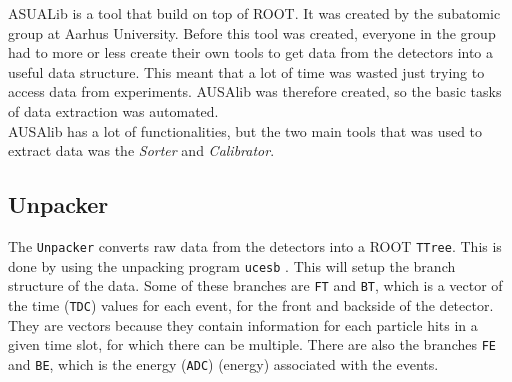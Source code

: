 ASUALib \cite{AUSA} is a tool that build on top of ROOT. It was created by the subatomic group at Aarhus University.
Before this tool was created, everyone in the group had to more or less create their own tools to get data from the detectors into a useful data structure. This meant that a lot of time was wasted just trying to access data from experiments. AUSAlib was therefore created, so the basic tasks of data extraction was automated. \\
AUSAlib has a lot of functionalities, but the two main tools that was used to extract data was the \textit{Sorter} and \textit{Calibrator}.

\subsection{Unpacker}
The \texttt{Unpacker} converts raw data from the detectors into a ROOT \texttt{TTree}. This is done by using the unpacking program \texttt{ucesb} \cite{ucesb}. This will setup the branch structure of the data. Some of these branches are \texttt{FT} and \texttt{BT}, which is a vector of the time (\texttt{TDC}) values for each event, for the front and backside of the detector. They are vectors because they contain information for each particle hits in a given time slot, for which there can be multiple. 
There are also the branches \texttt{FE} and \texttt{BE}, which is the energy (\texttt{ADC}) (energy) associated with the events. 

